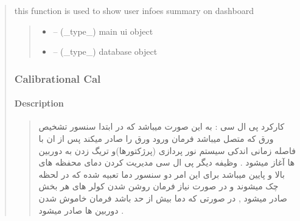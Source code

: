 \documentclass[letterpaper,10pt,english]{sphinxmanual}
\begin{document}
\begin{quote}
\begin{savenotes}\begin{fulllineitems}
\label{\detokenize{setting/backend/user_management_funcs:oxin.backend.user_management_funcs.show_users_summary_info}}
\pysigstartsignatures
{}
\pysigstopsignatures
\sphinxAtStartPar
this function is used to show user infoes summary on dashboard
\begin{quote}\begin{description}
\begin{itemize}
\item {} 
\sphinxAtStartPar
{} – (\_type\_) main ui object

\item {} 
\sphinxAtStartPar
{} – (\_type\_) database object

\end{itemize}

\end{description}\end{quote}

\end{fulllineitems}\end{savenotes}


\sphinxstepscope


\subsubsection{Calibrational Cal}
\label{\detokenize{setting/calibrationCal Dir:calibrational-cal}}\label{\detokenize{setting/calibrationCal Dir::doc}}

\paragraph{Description}
\label{\detokenize{setting/calibrationCal Dir:description}}\begin{quote}\begin{farsi}

\sphinxAtStartPar
کارکرد پی ال سی : به این صورت میباشد که در ابتدا سنسور تشخیص ورق که متصل میباشد فرمان ورود ورق را صادر میکند پس از ان با فاصله زمانی اندکی سیستم نور پردازی (پرژکتورها)و تریگ زدن به دوربین ها آغاز میشود . وظیفه دیگر پی ال سی مدیریت کردن دمای محفظه های بالا و پایین میباشد برای این امر دو سنسور دما تعبیه شده که در لحظه چک میشوند و در صورت نیاز فرمان روشن شدن کولر های هر بخش صادر میشود , در صورتی که دما بیش از حد باشد فرمان خاموش شدن دوربین ها صادر میشود .
\end{farsi}\end{quote}



\end{quote}
\end{document}
